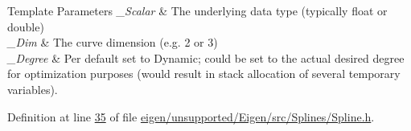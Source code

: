 \begin{DoxyTemplParams}{Template Parameters}
{\em \+\_\+\+Scalar} & The underlying data type (typically float or double) \\
\hline
{\em \+\_\+\+Dim} & The curve dimension (e.\+g. 2 or 3) \\
\hline
{\em \+\_\+\+Degree} & Per default set to Dynamic; could be set to the actual desired degree for optimization purposes (would result in stack allocation of several temporary variables). \\
\hline
\end{DoxyTemplParams}


Definition at line \hyperlink{eigen_2unsupported_2_eigen_2src_2_splines_2_spline_8h_source_l00035}{35} of file \hyperlink{eigen_2unsupported_2_eigen_2src_2_splines_2_spline_8h_source}{eigen/unsupported/\+Eigen/src/\+Splines/\+Spline.\+h}.

